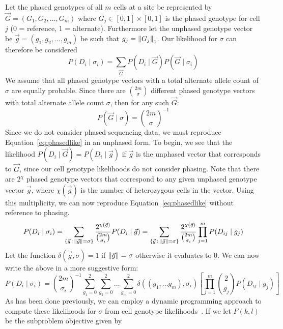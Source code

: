 \documentclass[../../main.tex]{subfiles}
\begin{document}
Let the phased genotypes of all $m$ cells at a site be represented by $\vec{G} = (G_1,G_2,\dots,G_m)$ where $G_j\in [0,1]\times[0,1]$ is the phased genotype for cell $j$ (0 = reference, 1 = alternate). Furthermore let the unphased genotype vector be $\vec{g} = (g_1,g_2,\dots,g_m)$ be such that $g_j = \left\lVert G_j\right\rVert_1$. Our likelihood for $\sigma$ can therefore be considered
\begin{equation} \label{eq:phasedlike}
P(D_i\mid\sigma_i) = \sum_{\vec{G}} P(D_i \mid \vec{G}) P(\vec{G} \mid \sigma_i)
\end{equation}
We assume that all phased genotype vectors with a total alternate allele count of $\sigma$ are equally probable. Since there are $\binom{2m}{\sigma}$ different phased genotype vectors with total alternate allele count $\sigma$, then for any such $\vec{G}$:
\begin{equation*}
P(\vec{G}\mid \sigma) = \binom{2m}{\sigma}^{-1}
\end{equation*}
Since we do not consider phased sequencing data, we must reproduce Equation~\eqref{eq:phasedlike} in an unphased form. To begin, we see that the likelihood $P(D_i\mid \vec{G}) = P(D_i\mid \vec{g})$ if $\vec{g}$ is the unphased vector that corresponds to $\vec{G}$, since our cell genotype likelihoods do not consider phasing. Note that there are $2^\chi$ phased genotype vectors that correspond to any given unphased genotype vector $\vec{g}$, where $\chi(\vec{g})$ is the number of heterozygous cells in the vector. Using this multiplicity, we can now reproduce Equation~\eqref{eq:phasedlike} without reference to phasing.
\begin{equation*}
P(D_i\mid\sigma_i) = \sum_{\{\vec{g}\, : \, \left\lVert\vec{g}\right\rVert=\sigma \}} \frac{2^{\chi(\vec{g})}}{\binom{2m}{\sigma_i}} P(D_i\mid\vec{g}) = \sum_{\{\vec{g}\, : \, \left\lVert\vec{g}\right\rVert=\sigma \}} \frac{2^{\chi(\vec{g})}}{\binom{2m}{\sigma_i}} \prod_{j=1}^{m}P(D_{ij}\mid g_{j})
\end{equation*}
Let the function $\delta(\vec{g},\sigma) = 1$ if $\left\lVert\vec{g}\right\rVert=\sigma$ otherwise it evaluates to 0. We can now write the above in a more suggestive form:
\begin{equation}\label{eq:sitelikelihood}
P(D_i\mid\sigma_i) = \binom{2m}{\sigma_i}^{-1}\sum_{g_1=0}^2\sum_{g_2=0}^2\dots\sum_{g_m=0}^2 \delta((g_1,\dots g_m),\sigma_i)\left[\prod_{j=1}^{m}\binom{2}{g_j}P(D_{ij}\mid g_{j})\right]
\end{equation}
As has been done previously, we can employ a dynamic programming approach to compute these likelihoods for $\sigma$ from cell genotype likelihoods~\cite{monovar, sciphi, ledurbin}. If we let $F(k,l)$ be the subproblem objective given by
\end{document}
